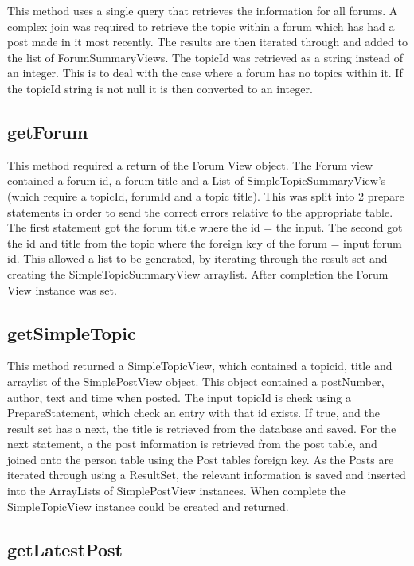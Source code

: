 \documentclass{article}
\begin{document}
This method uses a single query that retrieves the information for all forums. A complex join was required to retrieve the topic within a forum which has had a post made in it most recently. The results are then iterated through and added to the list of ForumSummaryViews. The topicId was retrieved as a string instead of an integer. This is to deal with the case where a forum has no topics within it. If the topicId string is not null it is then converted to an integer.

\subsection*{getForum}

This method required a return of the Forum View object. The Forum view contained a forum id, a forum title and a List of SimpleTopicSummaryView's (which require a topicId, forumId and a topic title). This was split into 2 prepare statements in order to send the correct errors relative to the appropriate table. The first statement got the forum title where the id = the input. The second got the id and title from the topic where the foreign key of the forum = input forum id. This allowed a list to be generated, by iterating through the result set and creating the SimpleTopicSummaryView arraylist. After completion the Forum View instance was set.


\subsection*{getSimpleTopic}

This method returned a SimpleTopicView, which contained a topicid, title and arraylist of the SimplePostView object. This object contained a postNumber, author, text and time when posted. The input topicId is check using a PrepareStatement, which check an entry with that id exists. If true, and the result set has a next, the title is retrieved from the database and saved. For the next statement, a the post information is retrieved from the post table, and joined onto the person table using the Post tables foreign key. As the Posts are iterated through using a ResultSet, the relevant information is saved and inserted into the ArrayLists of SimplePostView instances. When complete the SimpleTopicView instance could be created and returned.

\subsection*{getLatestPost}
\end{document}
